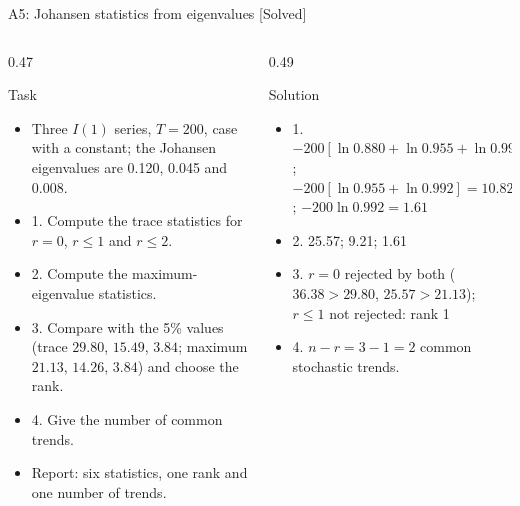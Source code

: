 \begin{frame}{A5: Johansen statistics from eigenvalues [Solved]}
\itemsize{\scriptsize}
\begin{columns}[T]
\begin{column}{0.47\textwidth}
\begin{block}{Task}
\begin{itemize}
    \item Three $I(1)$ series, $T = 200$, case with a constant; the Johansen eigenvalues are 0.120, 0.045 and 0.008.
    \item 1. Compute the trace statistics for $r = 0$, $r \le 1$ and $r \le 2$.
    \item 2. Compute the maximum-eigenvalue statistics.
    \item 3. Compare with the 5\% values (trace $29.80$, $15.49$, $3.84$; maximum $21.13$, $14.26$, $3.84$) and choose the rank.
    \item 4. Give the number of common trends.
    \item Report: six statistics, one rank and one number of trends.
\end{itemize}
\end{block}
\end{column}
\begin{column}{0.49\textwidth}
\begin{exampleblock}{Solution}
\begin{itemize}
    \item 1. $-200[\ln 0.880 + \ln 0.955 + \ln 0.992] = 36.38$; $-200[\ln 0.955 + \ln 0.992] = 10.82$; $-200\ln 0.992 = 1.61$
    \item 2. 25.57; 9.21; 1.61
    \item 3. $r = 0$ rejected by both ($36.38 > 29.80$, $25.57 > 21.13$); $r \le 1$ not rejected: rank 1
    \item 4. $n - r = 3 - 1 = 2$ common stochastic trends.
\end{itemize}
\end{exampleblock}
\end{column}
\end{columns}
\end{frame}

